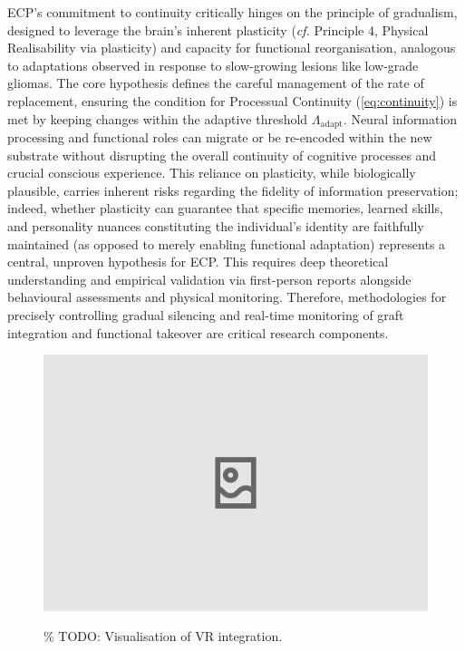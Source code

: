 \documentclass[10pt]{article}
\begin{document}
\begin{sloppypar}
  ECP’s commitment to continuity critically hinges on the principle of gradualism, designed to leverage the brain’s inherent plasticity (\textit{cf.} Principle 4, Physical Realisability via plasticity) and capacity for functional reorganisation, analogous to adaptations observed in response to slow-growing lesions like low-grade gliomas. The core hypothesis defines the careful management of the rate of replacement, ensuring the condition for Processual Continuity (\autoref{eq:continuity}) is met by keeping changes within the adaptive threshold \( \Lambda_{\text{adapt}} \). Neural information processing and functional roles can migrate or be re-encoded within the new substrate without disrupting the overall continuity of cognitive processes and crucial conscious experience. This reliance on plasticity, while biologically plausible, carries inherent risks regarding the fidelity of information preservation; indeed, whether plasticity can guarantee that specific memories, learned skills, and personality nuances constituting the individual’s identity are faithfully maintained (as opposed to merely enabling functional adaptation) represents a central, unproven hypothesis for ECP. This requires deep theoretical understanding and empirical validation via first-person reports alongside behavioural assessments and physical monitoring. Therefore, methodologies for precisely controlling gradual silencing and real-time monitoring of graft integration and functional takeover are critical research components.

  \begin{figure}[ht]
    \centering
    \includegraphics[width=\textwidth]{figures/ecp-vr-integration.png}
    \label{fig:ecp-vr-integration}
    \caption{\% TODO: Visualisation of VR integration.}
  \end{figure}


\end{sloppypar}
\end{document}
